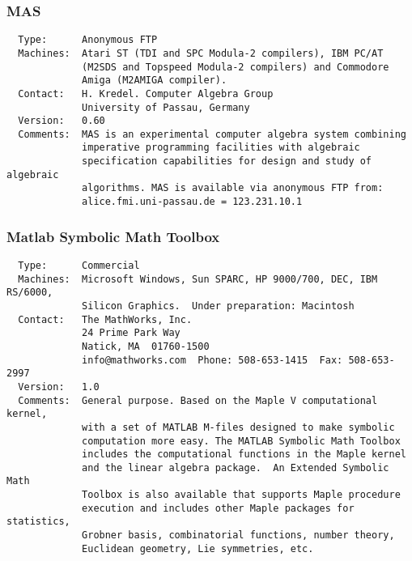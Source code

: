 \subsubsection{MAS}
\begin{verbatim}
  Type:      Anonymous FTP
  Machines:  Atari ST (TDI and SPC Modula-2 compilers), IBM PC/AT
             (M2SDS and Topspeed Modula-2 compilers) and Commodore
             Amiga (M2AMIGA compiler).
  Contact:   H. Kredel. Computer Algebra Group
             University of Passau, Germany
  Version:   0.60
  Comments:  MAS is an experimental computer algebra system combining
             imperative programming facilities with algebraic
             specification capabilities for design and study of algebraic
             algorithms. MAS is available via anonymous FTP from:
             alice.fmi.uni-passau.de = 123.231.10.1
\end{verbatim}

\subsubsection{Matlab Symbolic Math Toolbox}
\begin{verbatim}
  Type:      Commercial
  Machines:  Microsoft Windows, Sun SPARC, HP 9000/700, DEC, IBM RS/6000,
             Silicon Graphics.  Under preparation: Macintosh
  Contact:   The MathWorks, Inc.
             24 Prime Park Way
             Natick, MA  01760-1500
             info@mathworks.com  Phone: 508-653-1415  Fax: 508-653-2997
  Version:   1.0
  Comments:  General purpose. Based on the Maple V computational kernel,
             with a set of MATLAB M-files designed to make symbolic
             computation more easy. The MATLAB Symbolic Math Toolbox
             includes the computational functions in the Maple kernel
             and the linear algebra package.  An Extended Symbolic Math
             Toolbox is also available that supports Maple procedure
             execution and includes other Maple packages for statistics,
             Grobner basis, combinatorial functions, number theory,
             Euclidean geometry, Lie symmetries, etc.
\end{verbatim}


